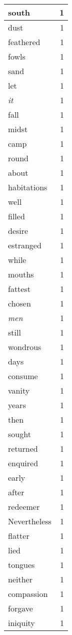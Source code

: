 \begin{center}
\begin{longtable}{l|r}
south & 1\\ \hline 
dust & 1\\ \hline 
feathered & 1\\ \hline 
fowls & 1\\ \hline 
sand & 1\\ \hline 
let & 1\\ \hline 
\emph{it} & 1\\ \hline 
fall & 1\\ \hline 
midst & 1\\ \hline 
camp & 1\\ \hline 
round & 1\\ \hline 
about & 1\\ \hline 
habitations & 1\\ \hline 
well & 1\\ \hline 
filled & 1\\ \hline 
desire & 1\\ \hline 
estranged & 1\\ \hline 
while & 1\\ \hline 
mouths & 1\\ \hline 
fattest & 1\\ \hline 
chosen & 1\\ \hline 
\emph{men} & 1\\ \hline 
still & 1\\ \hline 
wondrous & 1\\ \hline 
days & 1\\ \hline 
consume & 1\\ \hline 
vanity & 1\\ \hline 
years & 1\\ \hline 
then & 1\\ \hline 
sought & 1\\ \hline 
returned & 1\\ \hline 
enquired & 1\\ \hline 
early & 1\\ \hline 
after & 1\\ \hline 
redeemer & 1\\ \hline 
Nevertheless & 1\\ \hline 
flatter & 1\\ \hline 
lied & 1\\ \hline 
tongues & 1\\ \hline 
neither & 1\\ \hline 
compassion & 1\\ \hline 
forgave & 1\\ \hline 
iniquity & 1\\ \hline 

\end{longtable}
\end{center}
